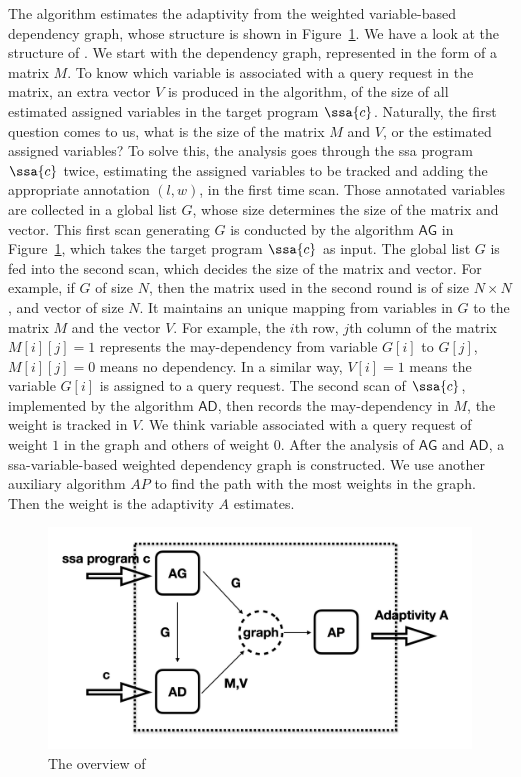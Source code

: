 The algorithm {\THESYSTEM} estimates the adaptivity from the weighted variable-based dependency graph, whose structure is shown in Figure~\ref{fig:adaptfun}. We have a look at the structure of {\THESYSTEM}. We start with the dependency graph, represented in the form of a matrix $M$. To know which variable is associated with a query request in the matrix, an extra vector $V$ is produced in the algorithm, of the size of all estimated assigned variables in the target program $\ssa{c}$. Naturally, the first question comes to us, what is the size of the matrix $M$ and $V$, or the estimated assigned variables? To solve this,    
the analysis goes through the ssa program $\ssa{c}$ twice, estimating the assigned variables to be tracked and adding the appropriate annotation $(l,w)$, in the first time scan. Those annotated variables are collected in a global list $G$, whose size determines the size of the matrix and vector. This first scan generating $G$ is conducted by the algorithm $\mathsf{AG}$ in Figure~\ref{fig:adaptfun}, which takes the target program $\ssa{c}$ as input. The global list $G$ is fed into the second scan, which decides the size of the matrix and vector.
For example, if $G$ of size $N$, then the matrix used in the second round is of size $N \times N$, and vector of size $N$. It maintains an unique mapping from variables in $G$ to the matrix $M$ and the vector $V$. For example,  the $i$th row, $j$th column of the matrix $M[i][j] =1 $ represents the may-dependency from variable $ G[i]$ to $G[j]$, $M[i][j] =0$ means no dependency. In a similar way, $V[i]=1$ means the variable $G[i]$ is assigned to a query request. The second scan of $\ssa{c}$, implemented by the algorithm $\mathsf{AD}$, then records the may-dependency in $M$, the weight is tracked in $V$. We think variable associated with a query request of weight $1$ in the graph and others of weight $0$. After the analysis of $\mathsf{AG}$ and $\mathsf{AD}$, a ssa-variable-based weighted dependency graph is constructed. We use another auxiliary algorithm $AP$ to find the path with the most weights in the graph. Then the weight is the adaptivity $A$ {\THESYSTEM} estimates.    

\begin{figure}
    \centering
    \includegraphics[width=0.7\columnwidth]{adapfun.png}
    \caption{The overview of {\THESYSTEM}}
    \label{fig:adaptfun}
\end{figure}


